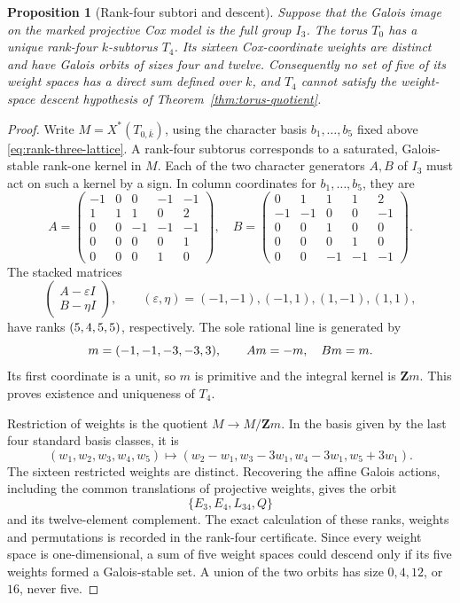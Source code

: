\documentclass[11pt]{article}
\newtheorem{proposition}[theorem]{Proposition}
\theoremstyle{remark}
\newcommand{\Z}{\mathbf Z}
\begin{document}
\begin{proposition}[Rank-four subtori and descent]
\label{prop:rank-four-descent}
%
%
Suppose that the Galois image on the marked projective Cox model is the full
group \(I_3\).  The torus \(T_0\) has a unique rank-four \(k\)-subtorus
\(T_4\).  Its sixteen Cox-coordinate weights are distinct and have Galois
orbits of sizes four and twelve.  Consequently no set of five of its weight
spaces has a direct sum defined over \(k\), and \(T_4\) cannot satisfy the
weight-space descent hypothesis of Theorem~\ref{thm:torus-quotient}.
\end{proposition}

\begin{proof}
Write \(M=X^*(T_{0,\bar k})\), using the character basis \(b_1,\ldots,b_5\) fixed above
\eqref{eq:rank-three-lattice}.  A rank-four subtorus corresponds
to a saturated, Galois-stable rank-one kernel in \(M\).  Each of the two
character generators \(A,B\) of \(I_3\) must act on such a kernel by a
sign.  In column coordinates for \(b_1,\ldots,b_5\), they are
\[
 A=\begin{pmatrix}
 -1&0&0&-1&-1\\1&1&1&0&2\\0&0&-1&-1&-1\\0&0&0&0&1\\0&0&0&1&0
 \end{pmatrix},\quad
 B=\begin{pmatrix}
 0&1&1&1&2\\-1&-1&0&0&-1\\0&0&1&0&0\\0&0&0&1&0\\0&0&-1&-1&-1
 \end{pmatrix}.
\]  The stacked matrices
\[
 \begin{pmatrix}A-\varepsilon I\\ B-\eta I\end{pmatrix},
 \qquad (\varepsilon,\eta)=(-1,-1),(-1,1),(1,-1),(1,1),
\]
have ranks \((5,4,5,5)\), respectively.  The sole rational
line is generated by
\[
 m=(-1,-1,-3,-3,3),\qquad Am=-m,\quad Bm=m.
\]
Its first coordinate is a unit, so \(m\) is primitive and the integral
kernel is \(\Z m\).  This proves existence and uniqueness of \(T_4\).

Restriction of weights is the quotient \(M\to M/\Z m\).  In the basis
given by the last four standard basis classes, it is
\[
 (w_1,w_2,w_3,w_4,w_5)\longmapsto
 (w_2-w_1,w_3-3w_1,w_4-3w_1,w_5+3w_1).
\]
The sixteen restricted weights are distinct.  Recovering the affine
Galois actions, including the common translations of projective weights,
gives the orbit
\[
 \{E_3,E_4,L_{34},Q\}
\]
and its twelve-element complement.  The exact calculation of these ranks,
weights and permutations is recorded in the rank-four certificate.
Since every weight space is one-dimensional, a sum of five weight spaces
could descend only if its five weights formed a Galois-stable set.  A union
of the two orbits has size \(0,4,12\), or \(16\), never five.
\end{proof}
\end{document}
